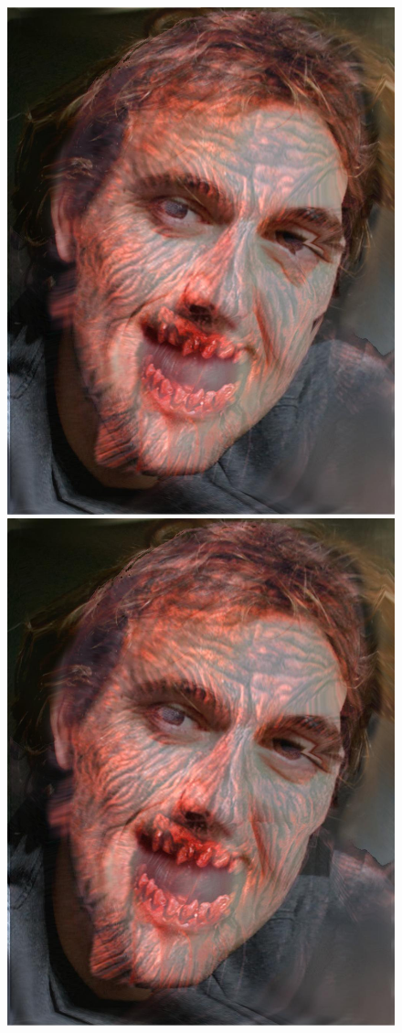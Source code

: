 \documentclass[11pt]{article}
\begin{document}
\begin{figure}[H]
\begin{center}
\includegraphics[scale=0.08]{figs/zombie/zombie_bf_11.jpg}
\includegraphics[scale=0.08]{figs/zombie/zombie_bf_12.jpg} 

\end{center}
\end{figure}
\end{document}
